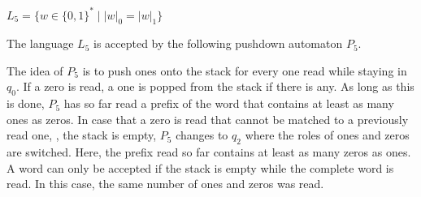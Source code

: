 \documentclass{exercise}
\begin{document}
\enlargethispage{2mm}
\subtask $L_5 = \{w \in \{0,1\}^* \mid |w|_0=|w|_1\}$
  \begin{solution}
    The language $L_5$ is accepted by the following pushdown automaton $P_5$.
    \begin{center}
    \end{center}
    The idea of $P_5$ is to push ones onto the stack for every one read while
    staying in $q_0$.  If a zero is read, a one is popped from the stack if
    there is any.  As long as this is done, $P_5$ has so far read a prefix
    of the word that contains at least as many ones as zeros.  In case that
    a zero is read that cannot be matched to a previously read one, \ie, the
    stack is empty, $P_5$ changes to $q_2$ where the roles of ones and zeros
    are switched.  Here, the prefix read so far contains at least as many zeros
    as ones.  A word can only be accepted if the stack is empty while the complete
    word is read.  In this case, the same number of ones and zeros was read.
  \end{solution}
\end{document}
